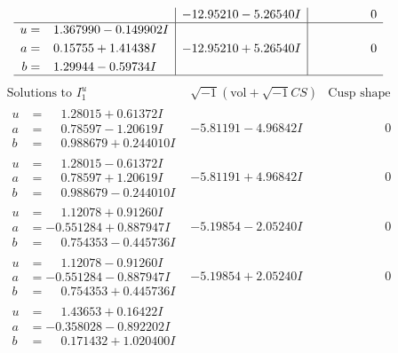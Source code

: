 \documentclass[1p]{elsarticle_modified}
\theoremstyle{definition}
\newcommand{\I}{\sqrt{-1}}
\begin{document}
$$\begin{array}{c|c|c}
 & -12.95210 - 5.26540 I & \phantom{-0.000000 } 0 \\ \hline\begin{aligned}
u &= \phantom{-}1.367990 - 0.149902 I \\
a &= \phantom{-}0.15755 + 1.41438 I \\
b &= \phantom{-}1.29944 - 0.59734 I\end{aligned}
 & -12.95210 + 5.26540 I & \phantom{-0.000000 } 0\\
 \hline 
 \end{array}$$\newpage$$\begin{array}{c|c|c}  
\text{Solutions to }I^u_{1}& \I (\text{vol} + \sqrt{-1}CS) & \text{Cusp shape}\\
 \hline 
\begin{aligned}
u &= \phantom{-}1.28015 + 0.61372 I \\
a &= \phantom{-}0.78597 - 1.20619 I \\
b &= \phantom{-}0.988679 + 0.244010 I\end{aligned}
 & -5.81191 - 4.96842 I & \phantom{-0.000000 } 0 \\ \hline\begin{aligned}
u &= \phantom{-}1.28015 - 0.61372 I \\
a &= \phantom{-}0.78597 + 1.20619 I \\
b &= \phantom{-}0.988679 - 0.244010 I\end{aligned}
 & -5.81191 + 4.96842 I & \phantom{-0.000000 } 0 \\ \hline\begin{aligned}
u &= \phantom{-}1.12078 + 0.91260 I \\
a &= -0.551284 + 0.887947 I \\
b &= \phantom{-}0.754353 - 0.445736 I\end{aligned}
 & -5.19854 - 2.05240 I & \phantom{-0.000000 } 0 \\ \hline\begin{aligned}
u &= \phantom{-}1.12078 - 0.91260 I \\
a &= -0.551284 - 0.887947 I \\
b &= \phantom{-}0.754353 + 0.445736 I\end{aligned}
 & -5.19854 + 2.05240 I & \phantom{-0.000000 } 0 \\ \hline\begin{aligned}
u &= \phantom{-}1.43653 + 0.16422 I \\
a &= -0.358028 - 0.892202 I \\
b &= \phantom{-}0.171432 + 1.020400 I\end{aligned}

\end{array}$$
\end{document}
